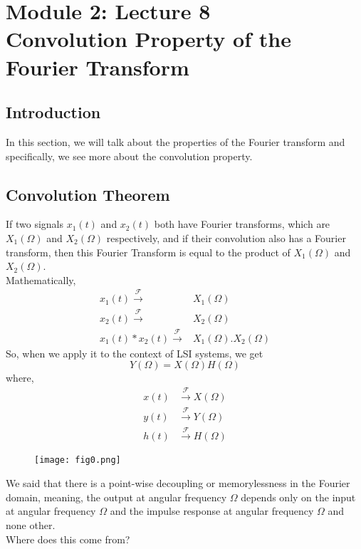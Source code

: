 \section{Module 2: Lecture 8\\Convolution Property of the Fourier Transform}

\subsection{Introduction}
	In this section, we will talk about the properties of the Fourier transform and specifically, we see more about the convolution property.
\subsection{Convolution Theorem}
	If two signals $x_1(t)$ and $x_2(t)$ both have Fourier transforms, which are $X_1(\Omega)$ and $X_2(\Omega)$ respectively, and if their convolution also has a Fourier transform, then this Fourier Transform is equal to the product of $X_1(\Omega)$ and $ X_2(\Omega)$.\\
	Mathematically,
	\begin{align}
		x_1(t) \xrightarrow{\mathcal{F}}& X_1(\Omega)\\
		x_2(t)\xrightarrow{\mathcal{F}}& X_2(\Omega)\\
		x_1(t)*x_2(t)\xrightarrow{\mathcal{F}}& X_1(\Omega).X_2(\Omega)
	\end{align}
	So, when we apply it to the context of LSI systems, we get
	\begin{equation}
		Y(\Omega)=X(\Omega)H(\Omega)
	\end{equation}
	where,
	\begin{align}
		x(t) &\xrightarrow{\mathcal{F}} X(\Omega)\\
		y(t) &\xrightarrow{\mathcal{F}} Y(\Omega)\\
		h(t) &\xrightarrow{\mathcal{F}} H(\Omega)
	\end{align}
	\begin{figure}[ht]
		\centering
		\texttt{[image: fig0.png]}
	\end{figure}
	We said that there is a point-wise decoupling or memorylessness in the Fourier domain, meaning, the output at angular frequency $\Omega$ depends only on the input at angular frequency $\Omega$ and the impulse response at angular frequency $\Omega$ and none other.\\
	Where does this come from?\\
